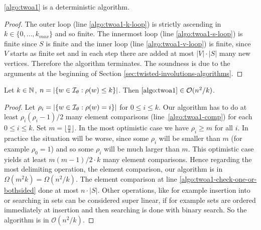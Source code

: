 \begin{lemm}
	\ref{algo:twoa1} is a deterministic algorithm.

	\begin{proof}
		The outer loop (line \ref{algo:twoa1-k-loop}) is strictly ascending in $k \in \{0,\ldots,k_{max}\}$ and so finite. The innermost loop (line \ref{algo:twoa1-s-loop}) is finite since $S$ is finite and the inner loop (line \ref{algo:twoa1-v-loop}) is finite, since $V$ starts as finite set and in each step there are added at most $|V| \cdot |S|$ many new vertices. Therefore the algorithm terminates. The soundness is due to the arguments at the beginning of Section \ref{sec:twisted-involutions-algorithms}.
	\end{proof}
\end{lemm}

\begin{lemm}
	Let $k \in \mathbb{N}$, $n = |\{ w \in \mathcal{I}_{\theta} : \rho(w) \leq k \}|$. Then $\ref{algo:twoa1} \in \mathcal{O}(n^2/k)$.

	\begin{proof}
		Let $\rho_i = |\{ w \in \mathcal{I}_{\theta} : \rho(w) = i \}|$ for $0 \leq i \leq k$. Our algorithm has to do at least $\rho_i (\rho_i - 1)/2$ many element comparisons (line~\ref{algo:twoa1-comp}) for each $0 \leq i \leq k$. Set $m = \lfloor \frac{n}{k} \rfloor$. In the most optimistic case we have $\rho_i \geq m$ for all $i$. In practice the situation will be worse, since some $\rho_i$ will be smaller than $m$ (for example $\rho_0 = 1$) and so some $\rho_i$ will be much larger than $m$. This optimistic case yields at least $m(m-1)/2 \cdot k$ many element comparisons. Hence regarding the most delimiting operation, the element comparison, our algorithm is in $\Omega(m^2k) = \Omega(n^2 / k)$. The element comparison at line \ref{algo:twoa1-check-one-or-bothsided} done at most $n \cdot |S|$. Other operations, like for example insertion into or searching in sets can be considered super linear, if for example sets are ordered immediately at insertion and then searching is done with binary search. So the algorithm is in $\mathcal{O}(n^2 / k)$.
	\end{proof}
\end{lemm}

